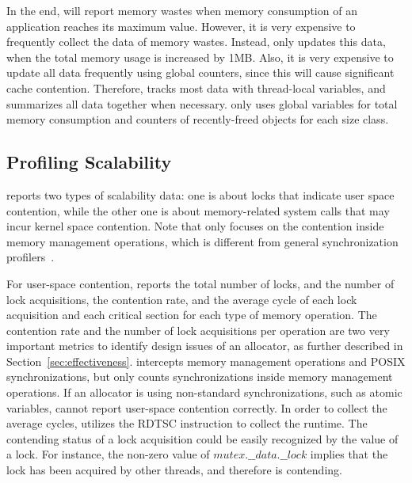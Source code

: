 In the end, \MP{} will report memory wastes when memory consumption of an application reaches its maximum value. However, it is very expensive to frequently collect the data of memory wastes. Instead, \MP{} only updates this data, when the total memory usage is increased by 1MB. Also, it is very expensive to update all data frequently using global counters, since this will cause significant cache contention. Therefore, \MP{} tracks most data with thread-local variables, and summarizes all data together when necessary. \MP{} only uses global variables for total memory consumption and counters of recently-freed objects for each size class. 

\subsection{Profiling Scalability}
\label{sec:profilingscale}

\MP{} reports two types of scalability data: one is about locks that indicate user space contention, while the other one is about memory-related system calls that may incur kernel space contention. Note that \MP{} only focuses on the contention inside memory management operations, which is different from general synchronization profilers~\cite{SyncProf, SyncPerf, wPerf}.

For user-space contention, \MP{} reports the total number of locks, and the number of lock acquisitions, the contention rate, and the average cycle of each lock acquisition and each critical section for each type of memory operation. The contention rate and the number of lock acquisitions per operation are two very important metrics to identify design issues of an allocator, as further described in Section~\ref{sec:effectiveness}.  \MP{} intercepts memory management operations and POSIX synchronizations, but only counts synchronizations inside memory management operations. If an allocator is using non-standard synchronizations, such as atomic variables, \MP{} cannot report user-space contention correctly. In order to collect the average cycles, \MP{} utilizes the RDTSC instruction to collect the runtime. The contending status of a lock acquisition could be easily recognized by the value of a lock. For instance, the non-zero value of $mutex.\_\_data.\_\_lock$ implies that the lock has been acquired by other threads, and therefore is contending. 

